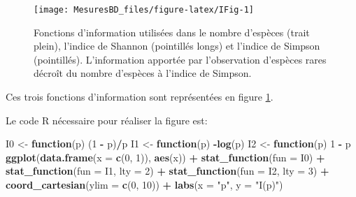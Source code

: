 \documentclass[
  11pt,
  french,
  a4paper,
  extrafontsizes,onecolumn,openright
  ]{memoir}
\newenvironment{Shaded}{\begin{snugshade}}{\end{snugshade}}
\newcommand{\ControlFlowTok}[1]{\textcolor[rgb]{0.13,0.29,0.53}{\textbf{#1}}}
\newcommand{\DataTypeTok}[1]{\textcolor[rgb]{0.13,0.29,0.53}{#1}}
\newcommand{\DecValTok}[1]{\textcolor[rgb]{0.00,0.00,0.81}{#1}}
\newcommand{\KeywordTok}[1]{\textcolor[rgb]{0.13,0.29,0.53}{\textbf{#1}}}
\newcommand{\NormalTok}[1]{#1}
\newcommand{\OperatorTok}[1]{\textcolor[rgb]{0.81,0.36,0.00}{\textbf{#1}}}
\newcommand{\StringTok}[1]{\textcolor[rgb]{0.31,0.60,0.02}{#1}}
\begin{document}
\scriptsize

\begin{figure}

{\centering \texttt{[image: MesuresBD\_files/figure-latex/IFig-1]} 

}

\caption{Fonctions d'information utilisées dans le nombre d'espèces (trait plein), l'indice de Shannon (pointillés longs) et l'indice de Simpson (pointillés). L'information apportée par l'observation d'espèces rares décroît du nombre d'espèces à l'indice de Simpson.}\label{fig:IFig}
\end{figure}

\normalsize

Ces trois fonctions d'information sont représentées en figure \ref{fig:IFig}.

Le code R nécessaire pour réaliser la figure est:

\scriptsize

\begin{Shaded}
\begin{Highlighting}[]
\NormalTok{I0 <-}\StringTok{ }\ControlFlowTok{function}\NormalTok{(p) (}\DecValTok{1} \OperatorTok{-}\StringTok{ }\NormalTok{p)}\OperatorTok{/}\NormalTok{p}
\NormalTok{I1 <-}\StringTok{ }\ControlFlowTok{function}\NormalTok{(p) }\OperatorTok{-}\KeywordTok{log}\NormalTok{(p)}
\NormalTok{I2 <-}\StringTok{ }\ControlFlowTok{function}\NormalTok{(p) }\DecValTok{1} \OperatorTok{-}\StringTok{ }\NormalTok{p}
\KeywordTok{ggplot}\NormalTok{(}\KeywordTok{data.frame}\NormalTok{(}\DataTypeTok{x =} \KeywordTok{c}\NormalTok{(}\DecValTok{0}\NormalTok{, }\DecValTok{1}\NormalTok{)), }\KeywordTok{aes}\NormalTok{(x)) }\OperatorTok{+}\StringTok{ }\KeywordTok{stat_function}\NormalTok{(}\DataTypeTok{fun =}\NormalTok{ I0) }\OperatorTok{+}\StringTok{ }
\StringTok{    }\KeywordTok{stat_function}\NormalTok{(}\DataTypeTok{fun =}\NormalTok{ I1, }\DataTypeTok{lty =} \DecValTok{2}\NormalTok{) }\OperatorTok{+}\StringTok{ }\KeywordTok{stat_function}\NormalTok{(}\DataTypeTok{fun =}\NormalTok{ I2, }
    \DataTypeTok{lty =} \DecValTok{3}\NormalTok{) }\OperatorTok{+}\StringTok{ }\KeywordTok{coord_cartesian}\NormalTok{(}\DataTypeTok{ylim =} \KeywordTok{c}\NormalTok{(}\DecValTok{0}\NormalTok{, }\DecValTok{10}\NormalTok{)) }\OperatorTok{+}\StringTok{ }\KeywordTok{labs}\NormalTok{(}\DataTypeTok{x =} \StringTok{"p"}\NormalTok{, }
    \DataTypeTok{y =} \StringTok{"I(p)"}\NormalTok{)}
\end{Highlighting}
\end{Shaded}
\end{document}
